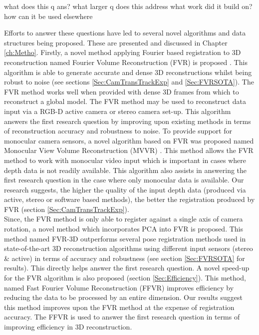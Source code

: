 what does this q ans?
what larger q does this address
what work did it build on?
how can it be used elsewhere

Efforts to answer these questions have led to several novel algorithms and data structures being proposed. These are presented and discussed in Chapter \ref{ch:Metho}. Firstly, a novel method applying Fourier based registration to 3D reconstruction named Fourier Volume Reconstruction (FVR) is proposed \cite{Lincoln16Fourier,Lincoln16Dense}. This algorithm is able to generate accurate and dense 3D reconstructions whilst being robust to noise (see sections \ref{Sec:CamTransTrackExp} and \ref{Sec:FVRSOTA}). The FVR method works well when provided with dense 3D frames from which to reconstruct a global model. The FVR method may be used to reconstruct data input via a RGB-D active camera or stereo camera set-up. This algorithm answers the first research question by improving upon existing methods in terms of reconstruction accuracy and robustness to noise. To provide support for monocular camera sensors, a novel algorithm based on FVR was proposed named Monocular View Volume Reconstruction (MVVR) \cite{Lincoln16Monocular}. This method allows the FVR method to work with monocular video input which is important in cases where depth data is not readily available. This algorithm also assists in answering the first research question in the case where only monocular data is available. Our research suggests, the higher the quality of the input depth data (produced via active, stereo or software based methods), the better the registration produced by FVR (section \ref{Sec:CamTransTrackExp}). \\

Since, the FVR method is only able to register against a single axis of camera rotation, a novel method which incorporates PCA into FVR is proposed. This method named FVR-3D outperforms several pose registration methods used in state-of-the-art 3D reconstruction algorithms using different input sensors (stereo \& active) in terms of accuracy and robustness (see section \ref{Sec:FVRSOTA} for results). This directly helps answer the first research question. A novel speed-up for the FVR algorithm is also proposed (section \ref{Sec:Efficiency}). This method, named Fast Fourier Volume Reconstruction (FFVR) improves efficiency by reducing the data to be processed by an entire dimension. Our results suggest this method improves upon the FVR method at the expense of registration accuracy. The FFVR is used to answer the first research question in terms of improving efficiency in 3D reconstruction. \\

